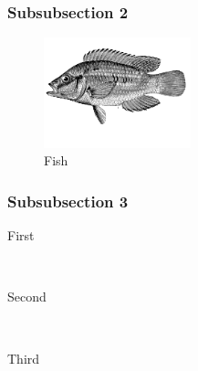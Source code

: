 \documentclass[12pt]{article} %
\begin{document}

\subsubsection{Subsubsection 2} %

\lipsum[6] %
\begin{figure} %
  \begin{center}
    \includegraphics[width=0.38\textwidth]{fish}
  \end{center}
  \caption{Fish}
\end{figure}
\lipsum[7-8] %


\subsubsection{Subsubsection 3} %

\begin{description} %

\item[First] \hfill \\
\lipsum[9] %

\item[Second] \hfill \\
\lipsum[10] %

\item[Third] \hfill \\
\lipsum[11] %

\end{description} 


\end{document}

